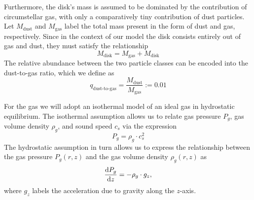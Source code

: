         Furthermore, the disk's mass is assumed to be dominated by the contribution 
        of circumstellar gas, with only a comparatively tiny contribution of dust particles.
        Let $M_\text{dust}$ and $M_\text{gas}$ label the total mass present in the form of dust 
        and gas, respectively. Since in the context of our model the disk consists entirely out 
        of gas and dust, they must satisfy the relationship
        \begin{equation}
            M_\text{disk} = M_\text{gas} + M_\text{disk}
        \end{equation}
        The relative abundance between the two particle classes can be encoded into the 
        dust-to-gas ratio, which we define as
        \begin{equation}
            \label{eq:dust-to-gas_ratio}
            q_\text{dust-to-gas}=\frac{M_\text{dust}}{M_\text{gas}}:=0.01
        \end{equation}

        For the gas we will adopt an isothermal model of an ideal gas in hydrostatic equilibrium.
        The isothermal assumption allows us to relate gas pressure $P_g$, 
        gas volume density $\rho_g$, and sound speed $c_s$ via the expression
        \begin{equation}
            \label{eq:isothermal_condition}
            P_g = \rho_g \cdot c_s^2
        \end{equation}
        The hydrostatic assumption in turn allows us to express the relationship between 
        the gas pressure $P_g(r,z)$ and the gas volume density $\rho_g(r,z)$ 
        as
        \begin{equation}
            \label{eq:hydrostatic_equilibrium}
            \deriv{P_g}{z} = - \rho_g \cdot g_z,  %
        \end{equation}
        where $g_z$ labels the acceleration due to gravity along the $z$-axis. \\


   
